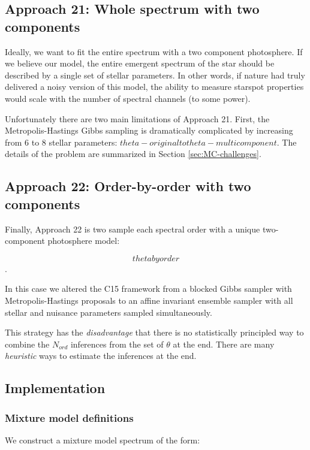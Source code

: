 \documentclass[onecolumn]{emulateapj}%
\newcommand{\iancze}{{\sc C15 }}
\begin{document}
\subsection{Approach 21: Whole spectrum with two components}
\label{sec:approach21}

Ideally, we want to fit the entire spectrum with a two component photosphere.  If we believe our model, the entire emergent spectrum of the star should be described by a single set of stellar parameters.  In other words, if nature had truly delivered a noisy version of this model, the ability to measure starspot properties would scale with the number of spectral channels (to some power).

Unfortunately there are two main limitations of Approach 21.  First, the Metropolis-Hastings Gibbs sampling is dramatically complicated by increasing from 6 to 8 stellar parameters: $theta-original to theta-multicomponent$.  The details of the problem are summarized in Section \ref{sec:MC-challenges}.


\subsection{Approach 22: Order-by-order with two components}
\label{sec:approach22}

Finally, Approach 22 is two sample each spectral order with a unique two-component photosphere model: 

$$ theta by order$$. 

In this case we altered the \iancze framework from a blocked Gibbs sampler with Metropolis-Hastings proposals to an affine invariant ensemble sampler with all stellar and nuisance parameters sampled simultaneously.  

This strategy has the \emph{disadvantage} that there is no statistically principled way to combine the $N_{ord}$ inferences from the set of $\theta$ at the end.  There are many \emph{heuristic} ways to estimate the inferences at the end.  


\subsection{Implementation}

\subsubsection{Mixture model definitions}

We construct a mixture model spectrum of the form:
\end{document}
